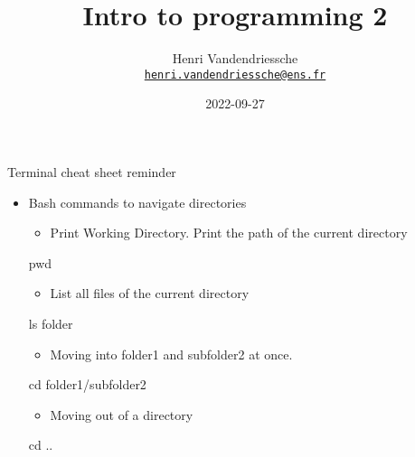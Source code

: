 \documentclass[
  8pt,
  ignorenonframetext,
]{beamer}
\title{Intro to programming 2}
\author{Henri Vandendriessche\\
\href{mailto:henri.vandendriessche@ens.fr}{\nolinkurl{henri.vandendriessche@ens.fr}}}
\date{2022-09-27}
\newenvironment{Shaded}{\begin{snugshade}}{\end{snugshade}}
\newcommand{\BuiltInTok}[1]{#1}
\newcommand{\FunctionTok}[1]{\textcolor[rgb]{0.00,0.00,0.00}{#1}}
\newcommand{\NormalTok}[1]{#1}
\providecommand{\tightlist}{%
  \setlength{\itemsep}{0pt}\setlength{\parskip}{0pt}}
\begin{document}
\frame{\titlepage}

\begin{frame}[fragile]{Terminal cheat sheet reminder}
\protect\hypertarget{terminal-cheat-sheet-reminder}{}
\begin{itemize}
\item
  Bash commands to navigate directories

  \begin{itemize}
  \tightlist
  \item
    Print Working Directory. Print the path of the current directory
  \end{itemize}

\begin{Shaded}
\begin{Highlighting}[]
\BuiltInTok{pwd}
\end{Highlighting}
\end{Shaded}

  \begin{itemize}
  \tightlist
  \item
    List all files of the current directory
  \end{itemize}

\begin{Shaded}
\begin{Highlighting}[]
\FunctionTok{ls}\NormalTok{ folder}
\end{Highlighting}
\end{Shaded}

  \begin{itemize}
  \tightlist
  \item
    Moving into folder1 and subfolder2 at once.
  \end{itemize}

\begin{Shaded}
\begin{Highlighting}[]
\BuiltInTok{cd}\NormalTok{ folder1/subfolder2}
\end{Highlighting}
\end{Shaded}

  \begin{itemize}
  \tightlist
  \item
    Moving out of a directory
  \end{itemize}

\begin{Shaded}
\begin{Highlighting}[]
\BuiltInTok{cd}\NormalTok{ ..}
\end{Highlighting}
\end{Shaded}


\end{itemize}
\end{frame}
\end{document}
